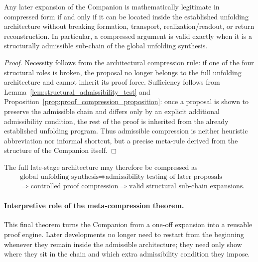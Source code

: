 \begin{theorem}\label{thm:meta_admissible_structural_compression}
Any later expansion of the Companion is mathematically legitimate in compressed form if and only if it can be located inside the established unfolding architecture without breaking formation, transport, realization/readout, or return reconstruction. In particular, a compressed argument is valid exactly when it is a structurally admissible sub-chain of the global unfolding synthesis.
\end{theorem}
\begin{proof}
Necessity follows from the architectural compression rule: if one of the four structural roles is broken, the proposal no longer belongs to the full unfolding architecture and cannot inherit its proof force. Sufficiency follows from Lemma~\ref{lem:structural_admissibility_test} and Proposition~\ref{prop:proof_compression_proposition}: once a proposal is shown to preserve the admissible chain and differs only by an explicit additional admissibility condition, the rest of the proof is inherited from the already established unfolding program. Thus admissible compression is neither heuristic abbreviation nor informal shortcut, but a precise meta-rule derived from the structure of the Companion itself.
\end{proof}

\begin{corollary}\label{cor:late_meta_compression_chain}
The full late-stage architecture may therefore be compressed as
\[
\begin{aligned}
&\text{global unfolding synthesis}
\Longrightarrow \text{admissibility testing of later proposals}\\
&\Longrightarrow \text{controlled proof compression}
\Longrightarrow \text{valid structural sub-chain expansions.}
\end{aligned}
\]
\end{corollary}

\paragraph{Interpretive role of the meta-compression theorem.}
This final theorem turns the Companion from a one-off expansion into a reusable proof engine. Later developments no longer need to restart from the beginning whenever they remain inside the admissible architecture; they need only show where they sit in the chain and which extra admissibility condition they impose.



